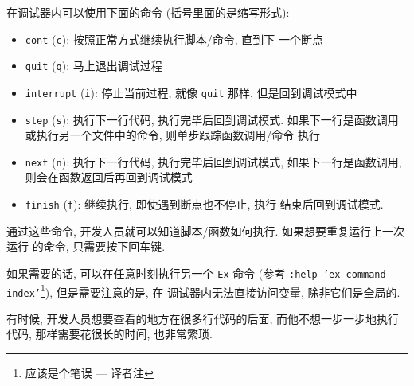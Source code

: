 在调试器内可以使用下面的命令 (括号里面的是缩写形式):
\begin{itemize}
    \item \texttt{cont} (\texttt{c}): 按照正常方式继续执行脚本/命令, 直到下
        一个断点
    \item \texttt{quit} (\texttt{q}): 马上退出调试过程
    \item \texttt{interrupt} (\texttt{i}): 停止当前过程, 就像 \texttt{quit}
        那样, 但是回到调试模式中
    \item \texttt{step} (\texttt{s}): 执行下一行代码, 执行完毕后回到调试模式.
        如果下一行是函数调用或执行另一个文件中的命令, 则单步跟踪函数调用/命令
        执行
    \item \texttt{next} (\texttt{n}): 执行下一行代码, 执行完毕后回到调试模式,
        如果下一行是函数调用, 则会在函数返回后再回到调试模式
    \item \texttt{finish} (\texttt{f}): 继续执行, 即使遇到断点也不停止, 执行
        结束后回到调试模式.
\end{itemize}

通过这些命令, 开发人员就可以知道脚本/函数如何执行. 如果想要重复运行上一次运行
的命令, 只需要按下回车键.

如果需要的话, 可以在任意时刻执行另一个 \texttt{Ex} 命令 (参考 \texttt{:help
'ex-command-index'}\footnote{应该是个笔误 --- 译者注}), 但是需要注意的是, 在
调试器内无法直接访问变量, 除非它们是全局的.

有时候, 开发人员想要查看的地方在很多行代码的后面, 而他不想一步一步地执行代码,
那样需要花很长的时间, 也非常繁琐.
